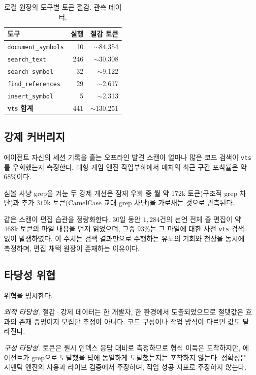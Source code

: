 \documentclass[11pt]{article}
\begin{document}
\begin{table}[h]
\centering
\caption{로컬 원장의 도구별 토큰 절감. 관측 데이터.}
\label{tab:savings}
\begin{tabular}{lrr}
\toprule
도구 & 실행 & 절감 토큰 \\
\midrule
\texttt{document\_symbols} & 10  & $\sim$84{,}354 \\
\texttt{search\_text}      & 246 & $\sim$30{,}308 \\
\texttt{search\_symbol}    & 32  & $\sim$9{,}122 \\
\texttt{find\_references}  & 29  & $\sim$2{,}617 \\
\texttt{insert\_symbol}    & 5   & $\sim$2{,}313 \\
\midrule
\textbf{vts 합계}          & 441 & $\sim$130{,}251 \\
\bottomrule
\end{tabular}
\end{table}

\subsection{강제 커버리지}
에이전트 자신의 세션 기록을 훑는 오프라인 발견 스캔이 얼마나 많은 코드 검색이 \texttt{vts}를
우회했는지 측정한다. 대형 게임 엔진 작업부하에서 매처의 최근 구간 포착률은 약 $68\%$이다.

심볼 사냥 grep을 겨눈 두 강제 개선은 잠재 우회 중 월 약 $172$k 토큰(구조적 grep 차단)과 추가
$319$k 토큰(CamelCase 교대 grep 차단)을 가로채는 것으로 관측된다.

같은 스캔이 편집 습관을 정량화한다. 30일 동안 $1{,}284$건의 선언 전체 줄 편집이 약 $468$k
토큰의 파일 내용을 먼저 읽었으며, 그중 $93\%$는 그 파일에 대한 사전 \texttt{vts} 검색 없이
발생하였다. 이 수치는 검색 결과만으로 수행하는 유도의 기회와 천장을 동시에 측정하며, 편집 채택
원장이 존재하는 이유이다.

\subsection{타당성 위협}
위협을 명시한다.

\emph{외적 타당성.} 절감·강제 데이터는 한 개발자, 한 환경에서 도출되었으므로 절댓값은 효과의
존재 증명이지 모집단 추정이 아니다. 코드 구성이나 작업 방식이 다르면 값도 달라진다.

\emph{구성 타당성.} 토큰은 원시 인덱스 응답 대비로 측정하므로 형식 이득은 포착하지만,
에이전트가 grep으로 도달했을 답에 동일하게 도달했는지는 포착하지 않는다. 정확성은 시맨틱 엔진의
사용과 라이브 검증에서 주장하며, 작업 성공 지표로 주장하지 않는다.
\end{document}
